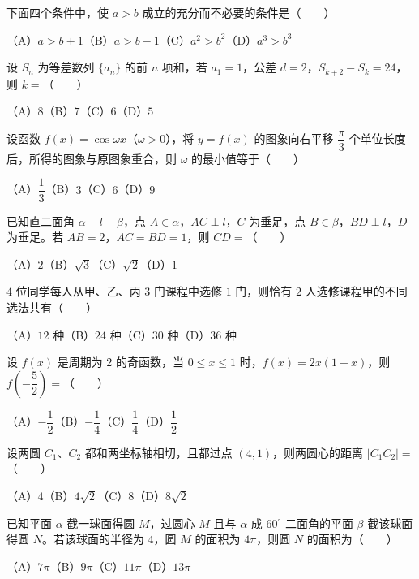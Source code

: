 \begin{question}
下面四个条件中，使 $a>b$ 成立的充分而不必要的条件是\mbox{（　　）}

（A）$a>b+1$\quad（B）$a>b-1$\quad（C）$a^2>b^2$\quad（D）$a^3>b^3$

\end{question}
\begin{question}
设 $S_n$ 为等差数列 $\{a_n\}$ 的前 $n$ 项和，若 $a_1=1$，公差 $d=2$，$S_{k+2}-S_k=24$，则 $k=$\mbox{（　　）}

（A）$8$\quad（B）$7$\quad（C）$6$\quad（D）$5$

\end{question}
\begin{question}
设函数 $f(x)=\cos\omega x$（$\omega>0$），将 $y=f(x)$ 的图象向右平移 $\dfrac\pi3$ 个单位长度后，所得的图象与原图象重合，则 $\omega$ 的最小值等于\mbox{（　　）}

（A）$\dfrac13$\quad（B）$3$\quad（C）$6$\quad（D）$9$

\end{question}
\begin{question}
已知直二面角 $\alpha-l-\beta$，点 $A\in\alpha$，$AC\perp l$，$C$ 为垂足，点 $B\in\beta$，$BD\perp l$，$D$ 为垂足。若 $AB=2$，$AC=BD=1$，则 $CD=$\mbox{（　　）}

（A）$2$\quad（B）$\sqrt3$\quad（C）$\sqrt2$\quad（D）$1$

\end{question}
\begin{question}
$4$ 位同学每人从甲、乙、丙 $3$ 门课程中选修 $1$ 门，则恰有 $2$ 人选修课程甲的不同选法共有\mbox{（　　）}

（A）$12$ 种\quad（B）$24$ 种\quad（C）$30$ 种\quad（D）$36$ 种

\end{question}
\begin{question}
设 $f(x)$ 是周期为 $2$ 的奇函数，当 $0\leq x\leq1$ 时，$f(x)=2x(1-x)$，则 $f\left(-\dfrac52\right)=$\mbox{（　　）}

（A）$-\dfrac12$\quad（B）$-\dfrac14$\quad（C）$\dfrac14$\quad（D）$\dfrac12$

\end{question}
\begin{question}
设两圆 $C_1\text{、}C_2$ 都和两坐标轴相切，且都过点 $(4,1)$，则两圆心的距离 $|C_1C_2|=$\mbox{（　　）}

（A）$4$\quad（B）$4\sqrt2$\quad（C）$8$\quad（D）$8\sqrt2$

\end{question}
\begin{question}
已知平面 $\alpha$ 截一球面得圆 $M$，过圆心 $M$ 且与 $\alpha$ 成 $60^\circ$ 二面角的平面 $\beta$ 截该球面得圆 $N$。若该球面的半径为 $4$，圆 $M$ 的面积为 $4\pi$，则圆 $N$ 的面积为\mbox{（　　）}

（A）$7\pi$\quad（B）$9\pi$\quad（C）$11\pi$\quad（D）$13\pi$

\end{question}

